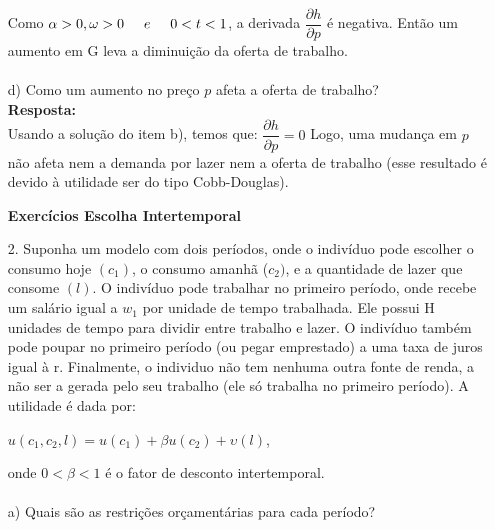 \begin{enumerate}
Como {$\alpha > 0, \omega > 0 \hspace{0.5cm} e \hspace{0.5cm} 0 < t < 1$}, a derivada {$\dfrac{\partial h}{\partial p}$} é negativa. Então um aumento em G leva a diminuição da oferta de trabalho.

\paragraph{} d) Como um aumento no preço {$p$} afeta a oferta de trabalho?\\

\textbf{Resposta:}\\

Usando a solução do item b), temos que: {$\dfrac{\partial h}{\partial p} = 0$}
Logo, uma mudança em {$p$} não afeta nem a demanda por lazer nem a oferta de trabalho (esse resultado é devido à utilidade ser do tipo Cobb-Douglas).


\newpage

\begin{center}
\textbf{Exercícios Escolha Intertemporal}\\
\end{center}

\item[2.]Suponha um modelo com dois períodos, onde o indivíduo pode escolher o consumo hoje {$(c_1)$},
o consumo amanhã ({$c_2)$}, e a quantidade de lazer que consome {$(l)$}. O indivíduo pode trabalhar no primeiro período, onde recebe um salário igual a {$w_1$} por unidade de tempo trabalhada. Ele possui H unidades de tempo para dividir entre trabalho e lazer. O indivíduo também pode poupar no primeiro período (ou pegar emprestado) a uma taxa de juros igual à r. Finalmente, o individuo não tem nenhuma outra fonte de renda, a não ser a gerada pelo seu trabalho (ele só trabalha no primeiro período). A utilidade é dada por:

\begin{center}
{$ u (c_1, c_2, l) = u (c_1) + \beta u (c_2) + \upsilon (l)$},
\end{center}

onde {$0 < \beta < 1$} é o fator de desconto intertemporal.\\

\paragraph{} a) Quais são as restrições orçamentárias para cada período?\\


\end{enumerate}
